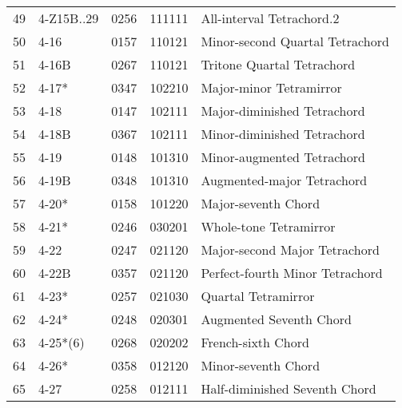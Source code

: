 \begin{table}[h]
\begin{tabular}{lllll}
49 & 4-Z15B..29                     & 0256  & 111111          & All-interval Tetrachord.2                         \\
50 & 4-16                           & 0157  & 110121          & Minor-second Quartal Tetrachord                   \\
51 & 4-16B                          & 0267  & 110121          & Tritone Quartal Tetrachord                        \\
52 & 4-17*                          & 0347  & 102210          & Major-minor Tetramirror                           \\
53 & 4-18                           & 0147  & 102111          & Major-diminished Tetrachord                       \\
54 & 4-18B                          & 0367  & 102111          & Minor-diminished Tetrachord                       \\
55 & 4-19                           & 0148  & 101310          & Minor-augmented Tetrachord                        \\
56 & 4-19B                          & 0348  & 101310          & Augmented-major Tetrachord                        \\
57 & 4-20*                          & 0158  & 101220          & Major-seventh Chord                               \\
58 & 4-21*                          & 0246  & 030201          & Whole-tone Tetramirror                            \\
59 & 4-22                           & 0247  & 021120          & Major-second Major Tetrachord                     \\
60 & 4-22B                          & 0357  & 021120          & Perfect-fourth Minor Tetrachord                   \\
61 & 4-23*                          & 0257  & 021030          & Quartal Tetramirror                               \\
62 & 4-24*                          & 0248  & 020301          & Augmented Seventh Chord                           \\
63 & 4-25*(6)                       & 0268  & 020202          & French-sixth Chord                                \\
64 & 4-26*                          & 0358  & 012120          & Minor-seventh Chord                               \\
65 & 4-27                           & 0258  & 012111          & Half-diminished Seventh Chord                     \\

\end{tabular}
\end{table}
